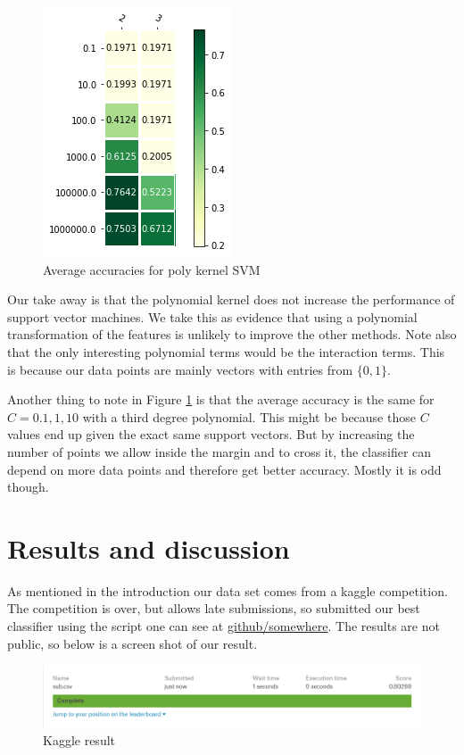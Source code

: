 \documentclass[parskip=half]{scrartcl}
\theoremstyle{definition}
\theoremstyle{remark}
\begin{document}
\begin{figure}[H]
\caption{Average accuracies for poly kernel SVM} \label{fig:polysvm}
\centering
\includegraphics[scale=0.6]{images/svm_poly.png}
\end{figure}

Our take away is that the polynomial kernel does not increase the performance of support vector machines. 
We take this as evidence that using a polynomial transformation of the features is unlikely to improve the other methods. 
Note also that the only interesting polynomial terms would be the interaction terms.
This is because our data points are mainly vectors with entries from $\{0,1\}$.

Another thing to note in Figure \ref{fig:polysvm} is that the average accuracy is the same for $C=0.1, 1, 10$ with a third degree polynomial. 
This might be because those $C$ values end up given the exact same support vectors. 
But by increasing the number of points we allow inside the margin and to cross it, the classifier can depend on more data points and therefore get better accuracy. 
Mostly it is odd though.  

\section{Results and discussion} \label{sec:results}

As mentioned in the introduction our data set comes from a kaggle competition. 
The competition is over, but allows late submissions, so submitted our best classifier using the script one can see at \url{github/somewhere}. 
The results are not public, so below is a screen shot of our result.

\begin{figure}[H]
\caption{Kaggle result} \label{fig:kaggleresult}
\centering
\includegraphics[scale=0.3]{images/kaggle_result.png}
\end{figure}
\end{document}
